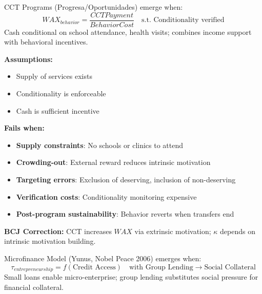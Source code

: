 
\begin{theorem}
\label{thm:cct}
CCT Programs (Progresa/Oportunidades) emerge when:
\begin{equation}
\boxed{WAX_{behavior} = \frac{CCT Payment}{Behavior Cost} \quad \text{s.t. Conditionality verified}}
\end{equation}
Cash conditional on school attendance, health visits; combines income support with behavioral incentives.
\end{theorem}

\begin{tcolorbox}[colback=red!5!white, colframe=red!75!black, title=Boundary Condition: Where CCT Fails]
\textbf{Assumptions:}
\begin{itemize}[nosep]
\item Supply of services exists
\item Conditionality is enforceable
\item Cash is sufficient incentive
\end{itemize}

\textbf{Fails when:}
\begin{itemize}[nosep]
\item \textbf{Supply constraints}: No schools or clinics to attend
\item \textbf{Crowding-out}: External reward reduces intrinsic motivation
\item \textbf{Targeting errors}: Exclusion of deserving, inclusion of non-deserving
\item \textbf{Verification costs}: Conditionality monitoring expensive
\item \textbf{Post-program sustainability}: Behavior reverts when transfers end
\end{itemize}

\textbf{BCJ Correction:} CCT increases $WAX$ via extrinsic motivation; $\kappa$ depends on intrinsic motivation building.
\end{tcolorbox}


\begin{theorem}
\label{thm:microfinance}
Microfinance Model (Yunus, Nobel Peace 2006) emerges when:
\begin{equation}
\boxed{\tau_{entrepreneurship} = f(\text{Credit Access}) \quad \text{with Group Lending} \to \text{Social Collateral}}
\end{equation}
Small loans enable micro-enterprise; group lending substitutes social pressure for financial collateral.
\end{theorem}

